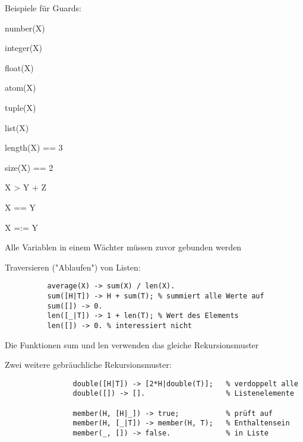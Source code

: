 \documentclass[10pt]{article}
\begin{document}
\begin{itemize*}
\begin{itemize*}
\begin{itemize*}
\begin{itemize*}
    \end{itemize*}
    \item Beispiele für Guards:
    \begin{itemize*}
      \item number(X)       %
      \item integer(X)      %
      \item float(X)        %
      \item atom(X)         %
      \item tuple(X)        %
      \item list(X)         %
      \item length(X) == 3  %
      \item size(X) == 2    %
      \item X > Y + Z       %
      \item X == Y          %
      \item X =:= Y         %
    \end{itemize*}
    \item Alle Variablen in einem Wächter müssen zuvor gebunden werden
  \end{itemize*}
\end{itemize*}

Traversieren ("Ablaufen") von Listen:
\begin{lstlisting}
          average(X) -> sum(X) / len(X).
          sum([H|T]) -> H + sum(T); % summiert alle Werte auf
          sum([]) -> 0.
          len([_|T]) -> 1 + len(T); % Wert des Elements
          len([]) -> 0. % interessiert nicht
\end{lstlisting}
\begin{itemize*}
  \item Die Funktionen sum und len verwenden das gleiche Rekursionsmuster
  \item Zwei weitere gebräuchliche Rekursionsmuster:
  \begin{lstlisting}
                double([H|T]) -> [2*H|double(T)];   % verdoppelt alle
                double([]) -> [].                   % Listenelemente
                
                member(H, [H|_]) -> true;           % prüft auf
                member(H, [_|T]) -> member(H, T);   % Enthaltensein
                member(_, []) -> false.             % in Liste
      \end{lstlisting}
\end{itemize*}


\end{itemize*}
\end{document}
